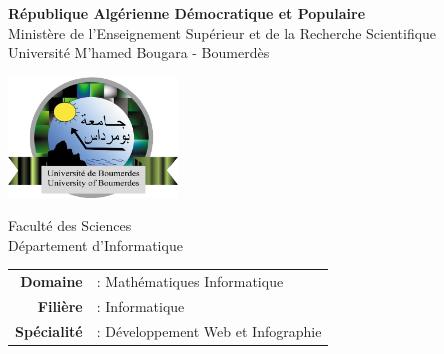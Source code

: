 \documentclass[12pt,a4paper,final]{report}
\begin{document}
\begin{titlepage}
\thispagestyle{empty}


\begin{center}
    \vspace*{0.1cm}
    {\Large \textbf{République Algérienne Démocratique et Populaire}} \\
    \vspace{0.3cm}
    {\large Ministère de l'Enseignement Supérieur et de la Recherche Scientifique} \\
    \vspace{0.3cm}
    {\large Université M'hamed Bougara - Boumerdès} \\
    \vspace{0.6cm}
    
    \includegraphics[width=4.5cm]{assets/docs/university_logo.png} \\
    \vspace{0.6cm}
    
    {\large Faculté des Sciences} \\
    \vspace{0.2cm}
    {\large Département d'Informatique} \\
    \vspace{0.6cm}
    
    \begin{tabular}{rl}
        \textbf{Domaine} & : Mathématiques Informatique \\
        \textbf{Filière} & : Informatique \\
        \textbf{Spécialité} & : Développement Web et Infographie \\
    \end{tabular} \\
    

\end{center}
\end{titlepage}
\end{document}
